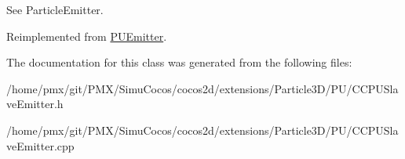 See Particle\+Emitter. 

Reimplemented from \hyperlink{classPUEmitter}{P\+U\+Emitter}.



The documentation for this class was generated from the following files\+:\begin{DoxyCompactItemize}
\item 
/home/pmx/git/\+P\+M\+X/\+Simu\+Cocos/cocos2d/extensions/\+Particle3\+D/\+P\+U/C\+C\+P\+U\+Slave\+Emitter.\+h\item 
/home/pmx/git/\+P\+M\+X/\+Simu\+Cocos/cocos2d/extensions/\+Particle3\+D/\+P\+U/C\+C\+P\+U\+Slave\+Emitter.\+cpp\end{DoxyCompactItemize}
